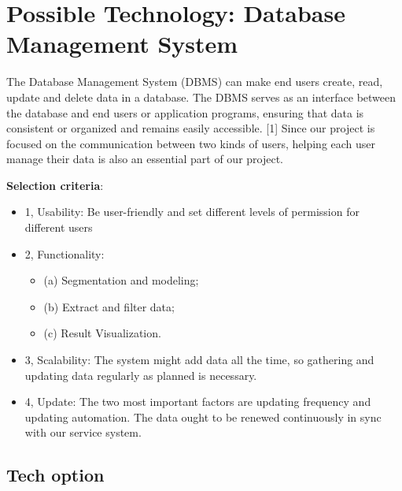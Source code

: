 \documentclass[onecolumn, draftclsnofoot,10pt, compsoc]{IEEEtran}
\begin{document}
\section{Possible Technology: Database Management System}
The Database Management System (DBMS) can make end users create, read, update and delete data in a database. The DBMS serves as an interface between the database and end users or application programs, ensuring that data is consistent or organized and remains easily accessible. [1] Since our project is focused on the communication between two kinds of users, helping each user manage their data is also an essential part of our project.

\textbf{Selection criteria}: \begin{itemize}
  \item 1, Usability: Be user-friendly and set different levels of permission for different users
  \item 2, Functionality: \begin{itemize}
    \item (a) Segmentation and modeling;
    \item (b) Extract and filter data; 
    \item (c) Result Visualization.
     \end{itemize}
  \item 3, Scalability: The system might add data all the time, so gathering and updating data regularly as planned is necessary. 
  \item 4, Update: The two most important factors are updating frequency and updating automation. The data ought to be renewed continuously in sync with our service system. 
\end{itemize}

\subsection{Tech option}
\end{document}
